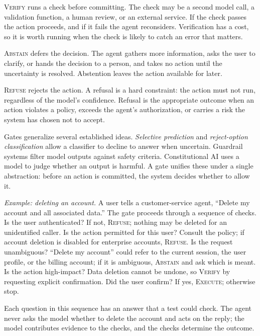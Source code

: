 \documentclass[11pt]{book}
\begin{document}
\textsc{Verify} runs a check before committing. The check may be a second model call, a validation function, a human review, or an external service. If the check passes the action proceeds, and if it fails the agent reconsiders. Verification has a cost, so it is worth running when the check is likely to catch an error that matters.

\textsc{Abstain} defers the decision. The agent gathers more information, asks the user to clarify, or hands the decision to a person, and takes no action until the uncertainty is resolved. Abstention leaves the action available for later.

\textsc{Refuse} rejects the action. A refusal is a hard constraint: the action must not run, regardless of the model's confidence. Refusal is the appropriate outcome when an action violates a policy, exceeds the agent's authorization, or carries a risk the system has chosen not to accept.

Gates generalize several established ideas. \emph{Selective prediction} \cite{geifman2017selective} and \emph{reject-option classification} \cite{chow1970optimum} allow a classifier to decline to answer when uncertain. Guardrail systems \cite{rebedea2023nemo} filter model outputs against safety criteria. Constitutional AI \cite{bai2022constitutional} uses a model to judge whether an output is harmful. A gate unifies these under a single abstraction: before an action is committed, the system decides whether to allow it.

\textit{Example: deleting an account.} A user tells a customer-service agent, ``Delete my account and all associated data.'' The gate proceeds through a sequence of checks. Is the user authenticated? If not, \textsc{Refuse}; nothing may be deleted for an unidentified caller. Is the action permitted for this user? Consult the policy; if account deletion is disabled for enterprise accounts, \textsc{Refuse}. Is the request unambiguous? ``Delete my account'' could refer to the current session, the user profile, or the billing account; if it is ambiguous, \textsc{Abstain} and ask which is meant. Is the action high-impact? Data deletion cannot be undone, so \textsc{Verify} by requesting explicit confirmation. Did the user confirm? If yes, \textsc{Execute}; otherwise stop.

Each question in this sequence has an answer that a test could check. The agent never asks the model whether to delete the account and acts on the reply; the model contributes evidence to the checks, and the checks determine the outcome.
\end{document}
